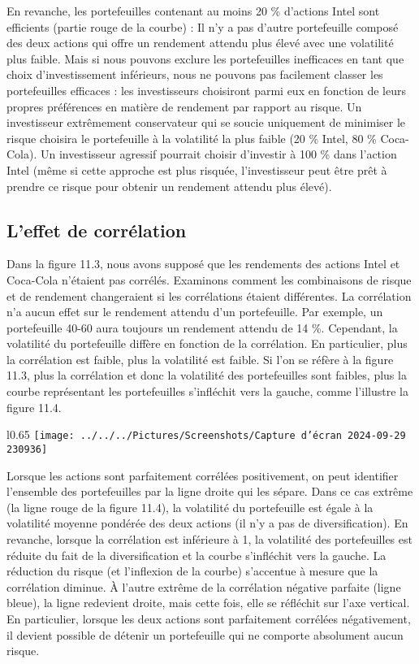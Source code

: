 \documentclass[a4paper, 12pt]{report}
\begin{document}
En revanche, les portefeuilles contenant au moins 20 \% d'actions Intel sont efficients (partie rouge de la courbe) : Il n'y a pas d'autre portefeuille composé des deux actions qui offre un rendement attendu plus élevé avec une volatilité plus faible. Mais si nous pouvons exclure les portefeuilles inefficaces en tant que choix d'investissement inférieurs, nous ne pouvons pas facilement classer les portefeuilles efficaces : les investisseurs choisiront parmi eux en fonction de leurs propres préférences en matière de rendement par rapport au risque. Un investisseur extrêmement conservateur qui se soucie uniquement de minimiser le risque choisira le portefeuille à la volatilité la plus faible (20 \% Intel, 80 \% Coca-Cola). Un investisseur agressif pourrait choisir d'investir à 100 \% dans l'action Intel (même si cette approche est plus risquée, l'investisseur peut être prêt à prendre ce risque pour obtenir un rendement attendu plus élevé).

\subsection{L'effet de corrélation}

Dans la figure 11.3, nous avons supposé que les rendements des actions Intel et Coca-Cola n'étaient pas corrélés. Examinons comment les combinaisons de risque et de rendement changeraient si les corrélations étaient différentes. La corrélation n'a aucun effet sur le rendement attendu d'un portefeuille. Par exemple, un portefeuille 40-60 aura toujours un rendement attendu de 14 \%. Cependant, la volatilité du portefeuille diffère en fonction de la corrélation. En particulier, plus la corrélation est faible, plus la volatilité est faible. Si l'on se réfère à la figure 11.3, plus la corrélation et donc la volatilité des portefeuilles sont faibles, plus la courbe représentant les portefeuilles s'infléchit vers la gauche, comme l'illustre la figure 11.4.
\begin{wrapfigure}{l}{0.65\textwidth}
	\centering
	\texttt{[image: ../../../Pictures/Screenshots/Capture d'écran 2024-09-29 230936]}
\end{wrapfigure}
Lorsque les actions sont parfaitement corrélées positivement, on peut identifier l'ensemble des portefeuilles par la ligne droite qui les sépare. Dans ce cas extrême (la ligne rouge de la figure 11.4), la volatilité du portefeuille est égale à la volatilité moyenne pondérée des deux actions (il n'y a pas de diversification). En revanche, lorsque la corrélation est inférieure à 1, la volatilité des portefeuilles est réduite du fait de la diversification et la courbe s'infléchit vers la gauche. La réduction du risque (et l'inflexion de la courbe) s'accentue à mesure que la corrélation diminue. À l'autre extrême de la corrélation négative parfaite (ligne bleue), la ligne redevient droite, mais cette fois, elle se réfléchit sur l'axe vertical. En particulier, lorsque les deux actions sont parfaitement corrélées négativement, il devient possible de détenir un portefeuille qui ne comporte absolument aucun risque.
\end{document}
